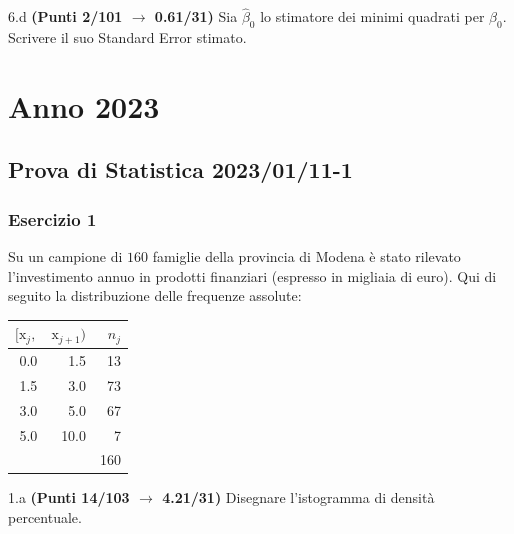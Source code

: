 \documentclass[
  11pt,
]{book}
\theoremstyle{mytheoremstyle}
\theoremstyle{mydefstyle}
\begin{document}
6.d \textbf{(Punti 2/101 \(\rightarrow\) 0.61/31)} Sia \(\hat\beta_0\) lo stimatore dei minimi quadrati per \(\beta_0\).
Scrivere il suo Standard Error stimato.

\chapter{Anno 2023}\label{anno-2023}

\section{Prova di Statistica 2023/01/11-1}\label{prova-di-statistica-20230111-1}

\subsection{Esercizio 1}\label{esercizio-1-20}

Su un campione di \(160\) famiglie della provincia di Modena è stato rilevato l'investimento annuo in prodotti finanziari (espresso in migliaia di euro). Qui di seguito la distribuzione delle frequenze assolute:

\begin{table}[H]
\centering
\begin{tabular}{rrr}
\toprule
$[\text{x}_j,$ & $\text{x}_{j+1})$ & $n_j$\\
\midrule
0.0 & 1.5 & 13\\
1.5 & 3.0 & 73\\
3.0 & 5.0 & 67\\
5.0 & 10.0 & 7\\
 &  & 160\\
\bottomrule
\end{tabular}
\end{table}

1.a \textbf{(Punti 14/103 \(\rightarrow\) 4.21/31)} Disegnare l'istogramma di densità percentuale.
\end{document}
